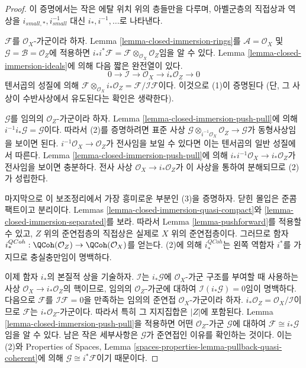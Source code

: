 \begin{proof}
이 증명에서는 작은 에탈 위치 위의 층들만을 다루며,
아벨군층의 직접상과 역상을 $i_{small, *}, i_{small}^{-1}$ 대신
$i_*, i^{-1}, \ldots$로 나타낸다.

\medskip\noindent
$\mathcal{F}$를 $\mathcal{O}_X$-가군이라 하자.
Lemma \ref{lemma-closed-immersion-rings}를
$\mathcal{A} = \mathcal{O}_X$ 및
$\mathcal{G} = \mathcal{B} = \mathcal{O}_Z$에 적용하면
$i_*i^*\mathcal{F} = \mathcal{F} \otimes_{\mathcal{O}_X} \mathcal{O}_Z$임을
알 수 있다. Lemma \ref{lemma-closed-immersion-ideals}에 의해
다음 짧은 완전열이 있다.
$$
0 \to \mathcal{I} \to \mathcal{O}_X \to i_*\mathcal{O}_Z \to 0
$$
텐서곱의 성질에 의해
$\mathcal{F} \otimes_{\mathcal{O}_X} i_*\mathcal{O}_Z
= \mathcal{F}/\mathcal{I}\mathcal{F}$이다. 이것으로 (1)이 증명된다
(단, 그 사상이 수반사상에서 유도된다는 확인은 생략한다).

\medskip\noindent
$\mathcal{G}$를 임의의 $\mathcal{O}_Z$-가군이라 하자.
Lemma \ref{lemma-closed-immersion-push-pull}에 의해
$i^{-1}i_*\mathcal{G} = \mathcal{G}$이다.
따라서 (2)를 증명하려면 표준 사상
$\mathcal{G} \otimes_{i^{-1}\mathcal{O}_X} \mathcal{O}_Z \to \mathcal{G}$가
동형사상임을 보이면 된다. $i^{-1}\mathcal{O}_X \to \mathcal{O}_Z$가
전사임을 보일 수 있다면 이는 텐서곱의 일반 성질에서 따른다.
Lemma \ref{lemma-closed-immersion-push-pull}에 의해
$i_*i^{-1}\mathcal{O}_X \to i_*\mathcal{O}_Z$가 전사임을 보이면
충분하다. 전사 사상 $\mathcal{O}_X \to i_*\mathcal{O}_Z$가 이
사상을 통하여 분해되므로 (2)가 성립한다.

\medskip\noindent
마지막으로 이 보조정리에서 가장 흥미로운 부분인 (3)을 증명하자.
닫힌 몰입은 준콤팩트이고 분리이다. Lemmas
\ref{lemma-closed-immersion-quasi-compact}와
\ref{lemma-closed-immersion-separated}를 보라.
따라서 Lemma \ref{lemma-pushforward}를 적용할 수 있고,
$Z$ 위의 준연접층의 직접상은 실제로 $X$ 위의 준연접층이다.
그러므로 함자
$i^{QCoh}_* : \QCoh(\mathcal{O}_Z)
\to \QCoh(\mathcal{O}_X)$를 얻는다.
(2)에 의해 $i^{QCoh}_*$는 왼쪽 역함자 $i^*$를 가지므로
충실충만임이 명백하다.

\medskip\noindent
이제 함자 $i_*$의 본질적 상을 기술하자.
$\mathcal{I}$는 $i_*\mathcal{G}$에 $\mathcal{O}_X$-가군 구조를
부여할 때 사용하는 사상 $\mathcal{O}_X \to i_*\mathcal{O}_Z$의
핵이므로, 임의의 $\mathcal{O}_Z$-가군에 대하여
$\mathcal{I}(i_*\mathcal{G}) = 0$임이 명백하다.
다음으로 $\mathcal{F}$를
$\mathcal{I}\mathcal{F} = 0$을 만족하는 임의의 준연접
$\mathcal{O}_X$-가군이라 하자.
$i_*\mathcal{O}_Z = \mathcal{O}_X/\mathcal{I}$이므로
$\mathcal{F}$는 $i_*\mathcal{O}_Z$-가군이다.
따라서 특히 그 지지집합은 $|Z|$에 포함된다.
Lemma \ref{lemma-closed-immersion-push-pull}을 적용하면 어떤
$\mathcal{O}_Z$-가군 $\mathcal{G}$에 대하여
$\mathcal{F} \cong i_*\mathcal{G}$임을 알 수 있다.
남은 작은 세부사항은 $\mathcal{G}$가 준연접인 이유를 확인하는 것이다.
이는 (2)와 Properties of Spaces, Lemma
\ref{spaces-properties-lemma-pullback-quasi-coherent}에 의해
$\mathcal{G} \cong i^*\mathcal{F}$이기 때문이다.
\end{proof}

